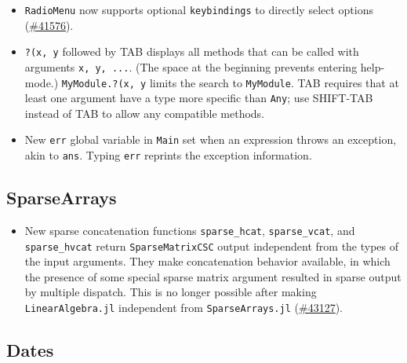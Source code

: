 \begin{itemize}
\item \texttt{RadioMenu} now supports optional \texttt{keybindings} to directly select options (\href{https://github.com/JuliaLang/julia/issues/41576}{\#41576}).


\item \texttt{?(x, y} followed by TAB displays all methods that can be called with arguments \texttt{x, y, ...}. (The space at the beginning prevents entering help-mode.) \texttt{MyModule.?(x, y} limits the search to \texttt{MyModule}. TAB requires that at least one argument have a type more specific than \texttt{Any}; use SHIFT-TAB instead of TAB to allow any compatible methods.


\item New \texttt{err} global variable in \texttt{Main} set when an expression throws an exception, akin to \texttt{ans}. Typing \texttt{err} reprints the exception information.

\end{itemize}


\hypertarget{8318560296908757234}{}


\subsection{SparseArrays}



\begin{itemize}
\item New sparse concatenation functions \texttt{sparse\_hcat}, \texttt{sparse\_vcat}, and \texttt{sparse\_hvcat} return \texttt{SparseMatrixCSC} output independent from the types of the input arguments. They make concatenation behavior available, in which the presence of some special {\textquotedbl}sparse{\textquotedbl} matrix argument resulted in sparse output by multiple dispatch. This is no longer possible after making \texttt{LinearAlgebra.jl} independent from \texttt{SparseArrays.jl} (\href{https://github.com/JuliaLang/julia/issues/43127}{\#43127}).

\end{itemize}


\hypertarget{9507963728197011587}{}


\subsection{Dates}



